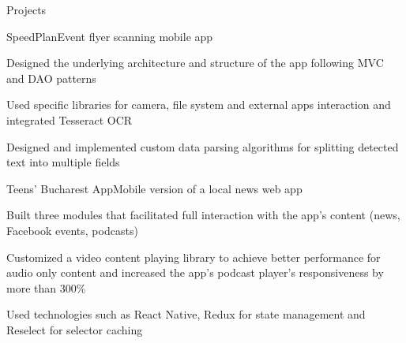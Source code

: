 \documentclass{resume} %
\begin{document}
\begin{rSection}{Projects}

\begin{rSubsection}{SpeedPlan}{Event flyer scanning mobile app}{}{}
\item Designed the underlying architecture and structure of the app following MVC and DAO patterns
\item Used specific libraries for camera, file system and external apps interaction and integrated Tesseract OCR
\item Designed and implemented custom data parsing algorithms for splitting detected text into multiple fields
\end{rSubsection}

\begin{rSubsection}{Teens' Bucharest App}{Mobile version of a local news web app}{}{}
\item Built three modules that facilitated full interaction with the app's content (news, Facebook events, podcasts)
\item Customized a video content playing library to achieve better performance for audio only content and increased the app's podcast player's responsiveness by more than 300\%
\item Used technologies such as React Native, Redux for state management and Reselect for selector caching
\end{rSubsection}

\end{rSection}
\end{document}
